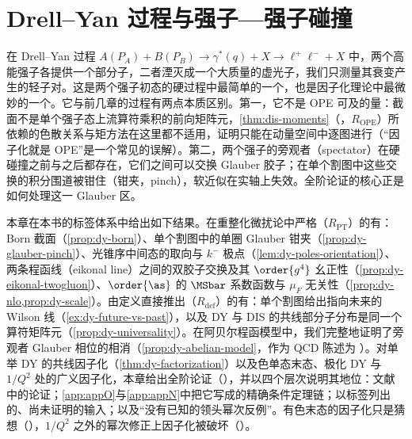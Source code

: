 \chapter{Drell--Yan 过程与强子—强子碰撞}\label{ch:dy}

在 Drell--Yan 过程 $A(P_A)+B(P_B)\to\gamma^*(q)+X\to\ell^+\ell^-+X$ 中，两个高能强子各提供一个部分子，二者湮灭成一个大质量的虚光子，我们只测量其衰变产生的轻子对。这是两个强子初态的硬过程中最简单的一个，也是因子化理论中最微妙的一个。它与前几章的过程有两点本质区别。第一，它不是 OPE 可及的量：截面不是单个强子态上流算符乘积的前向矩阵元，\cref{thm:dis-moments}（\tagR，$R_{\mathrm{OPE}}$）所依赖的色散关系与矩方法在这里都不适用，证明只能在动量空间中逐图进行（“因子化就是 OPE”是一个常见的误解）。第二，两个强子的旁观者（spectator）在硬碰撞之前与之后都存在，它们之间可以交换 Glauber 胶子；在单个割图中这些交换的积分围道被钳住（钳夹，pinch），软近似在实轴上失效。全阶论证的核心正是如何处理这一 Glauber 区。

本章在本书的标签体系中给出如下结果。在重整化微扰论中严格（$R_{\mathrm{PT}}$）的有：Born 截面（\cref{prop:dy-born}）、单个割图中的单圈 Glauber 钳夹（\cref{prop:dy-glauber-pinch}）、光锥序中间态的取向与 $k^-$ 极点（\cref{lem:dy-poles-orientation}）、两条程函线（eikonal line）之间的双胶子交换及其 $\order{g^4}$ 幺正性（\cref{prop:dy-eikonal-twogluon}）、$\order{\as}$ 的 $\MSbar$ 系数函数与 $\mu_F$ 无关性（\cref{prop:dy-nlo,prop:dy-scale}）。由定义直接推出（$R_{\mathrm{def}}$）的有：单个割图给出指向未来的 Wilson 线（\cref{ex:dy-future-vs-past}），以及 DY 与 DIS 的共线部分子分布是同一个算符矩阵元（\cref{prop:dy-universality}）。在阿贝尔程函模型中，我们完整地证明了旁观者 Glauber 相位的相消（\cref{prop:dy-abelian-model}，作为 QCD 陈述为 \tagP）。对单举 DY 的共线因子化（\cref{thm:dy-factorization}）以及色单态末态、极化 DY 与 $1/Q^2$ 处的广义因子化，本章给出全阶论证（\tagA），并以四个层次说明其地位：文献中的论证；\cref{app:appO}与\cref{app:appN}中把它写成的精确条件定理链；以标签列出的、尚未证明的输入；以及“没有已知的领头幂次反例”。有色末态的因子化只是猜想（\tagC），$1/Q^2$ 之外的幂次修正上因子化被破坏（\tagV）。

